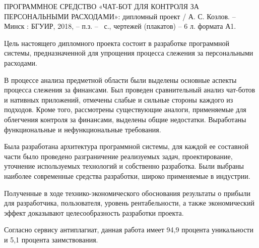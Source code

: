 \thispagestyle{empty}


\noindent
\MakeUppercase{Программное средство «Чат-бот для контроля за персональными расходами»}: дипломный проект / А. С. Козлов. -- \linebreak Минск : БГУИР, 2018, -- п.з. -- \totalpages~с., чертежей (плакатов) -- 6 л. формата А1.
\vspace{\baselineskip}

Цель настоящего дипломного проекта состоит в разработке программной системы, предназначенной для упрощения процесса слежения за персональными расходами.

В процессе анализа предметной области были выделены основные аспекты процесса слежения за финансами. Был проведен сравнительный анализ чат-ботов и нативных приложений, отмечены слабые и сильные стороны каждого из подходов. Кроме того, рассмотрены существующие аналоги, применяемые для облегчения контроля за финансами, выделены общие недостатки. Выработаны функциональные и нефункциональные требования.

Была разработана архитектура программной системы, для каждой ее составной части было проведено разграничение реализуемых задач, проектирование, уточнение используемых технологий и собственно разработка. Были выбраны наиболее современные средства разработки, широко применяемые в индустрии. 

Полученные в ходе технико-экономического обоснования результаты о прибыли для разработчика, пользователя, уровень рентабельности, а также экономический эффект доказывают целесообразность разработки про\-екта.

Согласно сервису антиплагиат, данная работа имеет 94,9 процента уникальности и 5,1 процента заимствования.